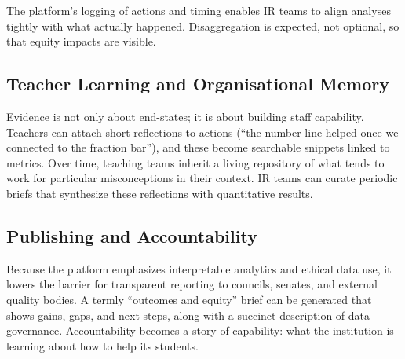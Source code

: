 The platform’s logging of actions and timing enables IR teams to align analyses tightly with what actually happened. Disaggregation is expected, not optional, so that equity impacts are visible.

\subsection{Teacher Learning and Organisational Memory}

Evidence is not only about end-states; it is about building staff capability. Teachers can attach short reflections to actions (``the number line helped once we connected to the fraction bar''), and these become searchable snippets linked to metrics. Over time, teaching teams inherit a living repository of what tends to work for particular misconceptions in their context. IR teams can curate periodic briefs that synthesize these reflections with quantitative results.

\subsection{Publishing and Accountability}

Because the platform emphasizes interpretable analytics and ethical data use, it lowers the barrier for transparent reporting to councils, senates, and external quality bodies. A termly ``outcomes and equity'' brief can be generated that shows gains, gaps, and next steps, along with a succinct description of data governance. Accountability becomes a story of capability: what the institution is learning about how to help its students.

